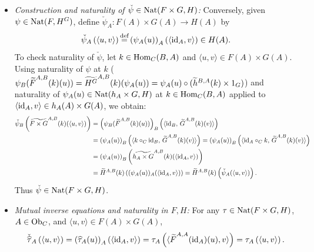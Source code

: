 \documentclass[10pt,a4paper]{article}
\begin{document}
\begin{enumerate}
\begin{itemize}
\begin{align*}
\widetilde{H^G}^{A,B}(k)\left(\widehat{\tau}_A(u)\right) &= \tau \circ (\Phi_{A,F}(u) \times 1_G) \circ (\widetilde{h}^{B,A}(k) \times 1_G) = \tau \circ \left((\Phi_{A,F}(u) \circ \widetilde{h}^{B,A}(k)) \times 1_G\right) \\
&= \tau \circ \left(\Phi_{B,F}(\FMor^{A,B}(k)(u)) \times 1_G\right) = \widehat{\tau}_B\left(\FMor^{A,B}(k)(u)\right).
\end{align*}
Thus $\widehat{\tau} \in \Nat(F, H^G)$.
\item \emph{Construction and naturality of $\check{\psi} \in {\textrm{Nat}}(F \times G, H)$:} Conversely, given $\psi \in {\textrm{Nat}}(F, H^G)$, define $\check{\psi}_A : F(A) \times G(A) \to H(A)$ by
$$\check{\psi}_A\left(\langle u, v \rangle\right) {\stackrel{{\textrm{def}}}{=}} \left(\psi_A(u)\right)_A\left(\langle {\textrm{id}}_A, v \rangle\right) \in H(A).$$
To check naturality of $\check{\psi}$, let $k \in {\textrm{Hom}}_C(B, A)$ and $\langle u, v \rangle \in F(A) \times G(A)$. Using naturality of $\psi$ at $k$ ($\psi_B({\widetilde{F}\textrm{}}^{A,B}(k)(u)) = \widetilde{H^G}^{A,B}(k)(\psi_A(u)) = \psi_A(u) \circ (\widetilde{h}^{B,A}(k) \times 1_G)$) and naturality of $\psi_A(u) \in {\textrm{Nat}}(h_A \times G, H)$ at $k \in {\textrm{Hom}}_C(B, A)$ applied to $\langle {\textrm{id}}_A, v \rangle \in h_A(A) \times G(A)$, we obtain:
\begin{align*}
\check{\psi}_B\left(\widetilde{F \times G}^{A,B}(k)(\langle u, v \rangle)\right) &= \left(\psi_B({\widetilde{F}\textrm{}}^{A,B}(k)(u))\right)_B\left(\langle {\textrm{id}}_B,\, {\widetilde{G}\textrm{}}^{A,B}(k)(v) \rangle\right) \\
&= \left(\psi_A(u)\right)_B\left(\langle k \circ_C {\textrm{id}}_B,\, {\widetilde{G}\textrm{}}^{A,B}(k)(v) \rangle\right) = \left(\psi_A(u)\right)_B\left(\langle {\textrm{id}}_A \circ_C k,\, {\widetilde{G}\textrm{}}^{A,B}(k)(v) \rangle\right) \\
&= \left(\psi_A(u)\right)_B\left(\widetilde{h_A \times G}^{A,B}(k)(\langle {\textrm{id}}_A, v \rangle)\right) \\
&= \widetilde{H}^{A,B}(k)\left((\psi_A(u))_A(\langle {\textrm{id}}_A, v \rangle)\right) = \widetilde{H}^{A,B}(k)\left(\check{\psi}_A(\langle u, v \rangle)\right).
\end{align*}
Thus $\check{\psi} \in {\textrm{Nat}}(F \times G, H)$.
\item \emph{Mutual inverse equations and naturality in $F, H$:} For any $\tau \in {\textrm{Nat}}(F \times G, H)$, $A \in {\textrm{Ob}}_C$, and $\langle u, v \rangle \in F(A) \times G(A)$,
$$\check{\widehat{\tau}}_A\left(\langle u, v \rangle\right) = \left(\widehat{\tau}_A(u)\right)_A\left(\langle {\textrm{id}}_A, v \rangle\right) = \tau_A\left(\langle {\widetilde{F}\textrm{}}^{A,A}({\textrm{id}}_A)(u), v \rangle\right) = \tau_A\left(\langle u, v \rangle\right).$$

\end{itemize}
\end{enumerate}
\end{document}
